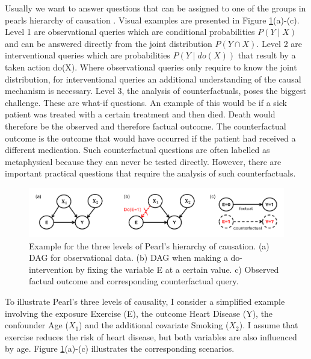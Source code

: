 Usually we want to answer questions that can be assigned to one of the groups in pearls hierarchy of causation \citet{pearl_book2009}. Visual examples are presented in Figure \ref{fig:pearl_levels}(a)-(c). Level 1 are observational queries which are conditional probabilities $P(Y \mid X)$ and can be answered directly from the joint distribution $P(Y \cap X)$. Level 2 are interventional queries which are probabilities $P(Y \mid do(X))$ that result by a taken action do(X). Where observational queries only require to know the joint distribution, for interventional queries an additional understanding of the causal mechanism is necessary. Level 3, the analysis of counterfactuals, poses the biggest challenge. These are what-if questions. An example of this would be if a sick patient was treated with a certain treatment and then died. Death would therefore be the observed and therefore factual outcome. The counterfactual outcome is the outcome that would have occurred if the patient had received a different medication. Such counterfactual questions are often labelled as metaphysical because they can never be tested directly. However, there are important practical questions that require the analysis of such counterfactuals.



\begin{figure}[H]
\centering
\includegraphics[width=1\textwidth]{img/pearl_levels.png}
\caption{Example for the three levels of Pearl's hierarchy of causation. (a) DAG for observational data. (b) DAG when making a do-intervention by fixing the variable E at a certain value. c) Observed factual outcome and corresponding counterfactual query.}
\label{fig:pearl_levels}
\end{figure}


To illustrate Pearl's three levels of causality, I consider a simplified example involving the exposure Exercise (E), the outcome Heart Disease (Y), the confounder Age ($X_1$) and the additional covariate Smoking ($X_2$). I assume that exercise reduces the risk of heart disease, but both variables are also influenced by age. Figure \ref{fig:pearl_levels}(a)-(c) illustrates the corresponding scenarios.

